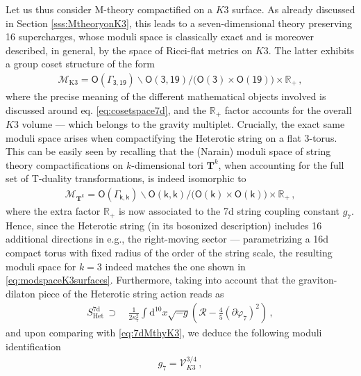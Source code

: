 Let us thus consider M-theory compactified on a $K3$ surface. As already discussed in Section \ref{sss:MtheoryonK3}, this leads to a seven-dimensional theory preserving 16 supercharges, whose moduli space is classically exact and is moreover described, in general, by the space of Ricci-flat metrics on $K3$. The latter exhibits a group coset structure of the form
%
\begin{align}\label{eq:modspaceK3surfaces}
	\mathcal{M}_{\text{K3}} = \mathsf{O(\Gamma_{3,19})}\backslash \mathsf{O(3,19)} / (\mathsf{O(3)} \times \mathsf{O(19))} \times \mathbb{R}_+\, ,
\end{align}
%
where the precise meaning of the different mathematical objects involved is discussed around eq. \eqref{eq:cosetspace7d}, and the $\mathbb{R}_+$ factor accounts for the overall $K3$ volume --- which belongs to the gravity multiplet. Crucially, the exact same moduli space arises when compactifying the Heterotic string on a flat 3-torus. This can be easily seen by recalling that the (Narain) moduli space of string theory compactifications on $k$-dimensional tori $\mathbf{T}^k$, when accounting for the full set of T-duality transformations, is indeed isomorphic to \cite{Narain:1985jj,Narain:1986am}
%
\begin{align}
	\mathcal{M}_{\mathbf{T}^k} = \mathsf{O(\Gamma_{k,k})}\backslash \mathsf{O(k,k)} / (\mathsf{O(k)} \times \mathsf{O(k))} \times \mathbb{R}_+\, ,
\end{align}
%
where the extra factor $\mathbb{R}_+$ is now associated to the 7d string coupling constant $g_7$. Hence, since the Heterotic string (in its bosonized description) includes 16 additional directions in e.g., the right-moving sector --- parametrizing a 16d compact torus with fixed radius of the order of the string scale, the resulting moduli space for $k=3$ indeed matches the one shown in \eqref{eq:modspaceK3surfaces}. Furthermore, taking into account that the graviton-dilaton piece of the Heterotic string action reads as
%
\begin{equation}
			\begin{aligned}
				S_\text{Het}^{\text{7d}} \, \supset\, &\frac{1}{2\kappa_{7}^2} \int \text{d}^{10}x\sqrt{-g} \left(\mathcal{R}-\frac{4}{5}(\partial \varphi_7)^2\right)\, , 
			\end{aligned}
\end{equation}
%
and upon comparing with \eqref{eq:7dMthyK3}, we deduce the following moduli identification
%
\begin{align}
\label{eq:mthyHetmoduli}
 g_7 = \mathcal{V}_{K3}^{3/4}\, , 
\end{align}
